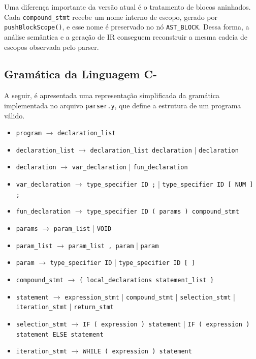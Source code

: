 \documentclass[
	12pt,				%
	oneside,
	a4paper,			%
	english,			%
	french,				%
	spanish,			%
	brazil,				%
	]{abntex2}
\begin{document}
Uma diferença importante da versão atual é o tratamento de blocos aninhados. Cada \texttt{compound\_stmt} recebe um nome interno de escopo, gerado por \texttt{pushBlockScope()}, e esse nome é preservado no nó \texttt{AST\_BLOCK}. Dessa forma, a análise semântica e a geração de IR conseguem reconstruir a mesma cadeia de escopos observada pelo parser.

\subsection{Gramática da Linguagem C-}
A seguir, é apresentada uma representação simplificada da gramática implementada no arquivo \texttt{parser.y}, que define a estrutura de um programa válido.

\begin{itemize}
    \item \texttt{program} $\rightarrow$ \texttt{declaration\_list}
    \item \texttt{declaration\_list} $\rightarrow$ \texttt{declaration\_list declaration} | \texttt{declaration}
    \item \texttt{declaration} $\rightarrow$ \texttt{var\_declaration} | \texttt{fun\_declaration}
    \item \texttt{var\_declaration} $\rightarrow$ \texttt{type\_specifier ID ;} | \texttt{type\_specifier ID [ NUM ] ;}
    \item \texttt{fun\_declaration} $\rightarrow$ \texttt{type\_specifier ID ( params ) compound\_stmt}
    \item \texttt{params} $\rightarrow$ \texttt{param\_list} | \texttt{VOID}
    \item \texttt{param\_list} $\rightarrow$ \texttt{param\_list , param} | \texttt{param}
    \item \texttt{param} $\rightarrow$ \texttt{type\_specifier ID} | \texttt{type\_specifier ID [ ]}
    \item \texttt{compound\_stmt} $\rightarrow$ \texttt{\{ local\_declarations statement\_list \}}
    \item \texttt{statement} $\rightarrow$ \texttt{expression\_stmt} | \texttt{compound\_stmt} | \texttt{selection\_stmt} | \texttt{iteration\_stmt} | \texttt{return\_stmt}
    \item \texttt{selection\_stmt} $\rightarrow$ \texttt{IF ( expression ) statement} | \texttt{IF ( expression ) statement ELSE statement}
    \item \texttt{iteration\_stmt} $\rightarrow$ \texttt{WHILE ( expression ) statement}

\end{itemize}
\end{document}
